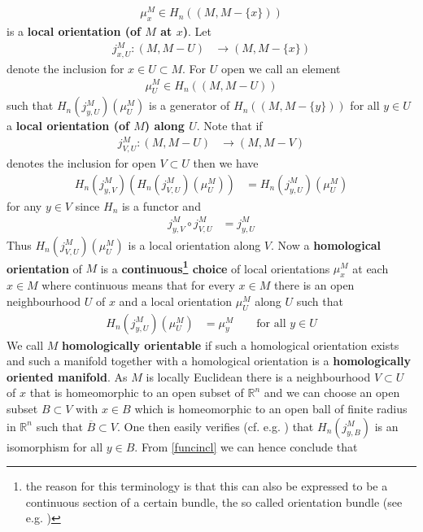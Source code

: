 \begin{align*}
  \mu_{x}^{M}
  \in
  H_{n}((M,M - \lbrace x \rbrace))
\end{align*}
is a \textbf{local orientation (of $M$ at $x$)}. Let
\begin{align*}
  j_{x,U}^{M}
  \colon
  (M,M - U)
  &\to
  (M,M - \lbrace x \rbrace)
\end{align*}
denote the inclusion for $x \in U \subset M$. For $U$ open we call an element
\begin{align*}
  \mu_{U}^{M}
  \in
  H_{n}((M,M - U))
\end{align*}
such that $H_{n}(j_{y,U}^{M})(\mu_{U}^{M})$ is a generator of $H_{n}((M,M - \lbrace y \rbrace))$ for all $y \in U$ a \textbf{local orientation (of $M$) along $U$}. Note that if
\begin{align*}
  j_{V,U}^{M}
  \colon
  (M,M - U)
  &\to
  (M,M - V)
\end{align*}
denotes the inclusion for open $V \subset U$ then we have
\begin{align}
\label{funcincl}
  H_{n}(j_{y,V}^{M})
  \left(
    H_{n}(j_{V,U}^{M})(\mu_{U}^{M})
  \right)
  &=
  H_{n}(j_{y,U}^{M})(\mu_{U}^{M})
\end{align}
for any $y \in V$ since $H_{n}$ is a functor and
\begin{align*}
  j_{y,V}^{M}
  \circ
  j_{V,U}^{M}
  &=
  j_{y,U}^{M}
\end{align*}
Thus $H_{n}(j_{V,U}^{M})(\mu_{U}^{M})$ is a local orientation along $V$. Now a \textbf{homological orientation} of $M$ is a \textbf{continuous\footnote{the reason for this terminology is that this can also be expressed to be a continuous section of a certain bundle, the so called orientation bundle (see e.g. \cite{ad05eef9})} choice} of local orientations $\mu_{x}^{M}$ at each $x \in M$ where continuous means that for every $x \in M$ there is an open neighbourhood $U$ of $x$ and a local orientation $\mu_{U}^{M}$ along $U$ such that
\begin{align*}
  H_{n}(j_{y,U}^{M})(\mu_{U}^{M})
  &=
  \mu_{y}^{M}
  \qquad
  \text{for all }
  y
  \in
  U
\end{align*}
We call $M$ \textbf{homologically orientable} if such a homological orientation exists and such a manifold together with a homological orientation is a \textbf{homologically oriented manifold}. As $M$ is locally Euclidean there is a neighbourhood $V \subset U$ of $x$ that is homeomorphic to an open subset of $\mathbb{R}^{n}$ and we can choose an open subset $B \subset V$ with $x \in B$ which is homeomorphic to an open ball of finite radius in $\mathbb{R}^{n}$ such that $\overline{B} \subset V$. One then easily verifies (cf. e.g. \cite{1a21f4c7}) that $H_{n}(j_{y,B}^{M})$ is an isomorphism for all $y \in B$. From \eqref{funcincl} we can hence conclude that
